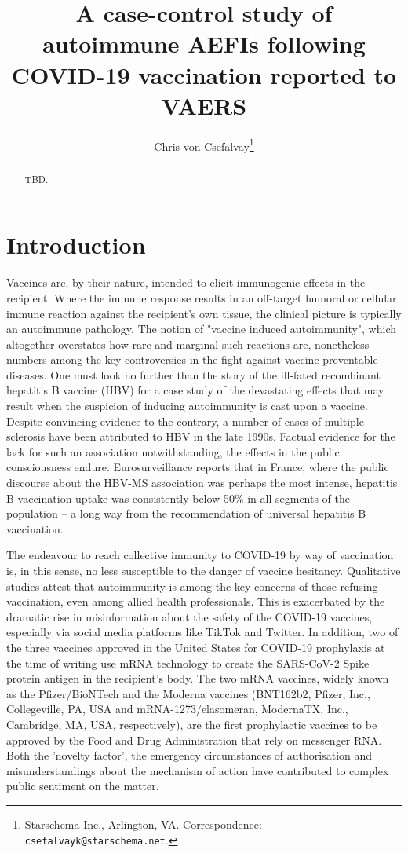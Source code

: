 \documentclass{article}
\title{A case-control study of autoimmune AEFIs following COVID-19 vaccination reported to VAERS}
\author{Chris von Csefalvay\thanks{Starschema Inc., Arlington, VA. Correspondence: \texttt{csefalvayk@starschema.net}.}}
\begin{document}
\maketitle

\begin{abstract}
TBD.
\end{abstract}

\section{Introduction}

Vaccines are, by their nature, intended to elicit immunogenic effects in the recipient.
Where the immune response results in an off-target humoral or cellular immune reaction against the recipient's own tissue, the clinical picture is typically an autoimmune pathology.
The notion of "vaccine induced autoimmunity", which altogether overstates how rare and marginal such reactions are, nonetheless numbers among the key controversies in the fight against vaccine-preventable diseases.\cite{10.1093/cid/ciz135}
One must look no further than the story of the ill-fated recombinant hepatitis B vaccine (HBV) for a case study of the devastating effects that may result when the suspicion of inducing autoimmunity is cast upon a vaccine.
Despite convincing evidence to the contrary,\cite{doi:10.1056/NEJM200102013440502} a number of cases of multiple sclerosis have been attributed to HBV in the late 1990s.
Factual evidence for the lack for such an association notwithstanding,\cite{DeStefano_2002} the effects in the public consciousness endure.
Eurosurveillance reports that in France, where the public discourse about the HBV-MS association was perhaps the most intense, hepatitis B vaccination uptake was consistently below 50\% in all segments of the population\cite{Rey_2018} – a long way from the recommendation of universal hepatitis B vaccination.

The endeavour to reach collective immunity to COVID-19 by way of vaccination is, in this sense, no less susceptible to the danger of vaccine hesitancy.\cite{dror2020vaccine}
Qualitative studies attest that autoimmunity is among the key concerns of those refusing vaccination, even among allied health professionals.\cite{berry2021lessons}
This is exacerbated by the dramatic rise in misinformation about the safety of the COVID-19 vaccines,\cite{islam2021covid} especially via social media platforms like TikTok\cite{basch2021global} and Twitter.\cite{kearney2020twitter,krittanawong2020misinformation}
In addition, two of the three vaccines approved in the United States for COVID-19 prophylaxis at the time of writing use mRNA technology to create the SARS-CoV-2 Spike protein antigen in the recipient's body.
The two mRNA vaccines, widely known as the Pfizer/BioNTech and the Moderna vaccines (BNT162b2, Pfizer, Inc., Collegeville, PA, USA and mRNA-1273/elasomeran, ModernaTX, Inc., Cambridge, MA, USA, respectively), are the first prophylactic vaccines to be approved by the Food and Drug Administration that rely on messenger RNA.
Both the 'novelty factor', the emergency circumstances of authorisation and misunderstandings about the mechanism of action have contributed to complex public sentiment on the matter.
\end{document}

